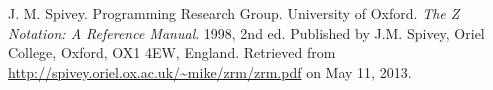 
\begin{thebibliography}{9} %


J. M. Spivey. Programming Research Group. University of Oxford. \emph{The Z
Notation: A Reference Manual}. 1998, 2nd ed. Published by J.M. Spivey, Oriel
College, Oxford, OX1 4EW, England. Retrieved from
\url{http://spivey.oriel.ox.ac.uk/~mike/zrm/zrm.pdf} on May 11, 2013.

\end{thebibliography}


